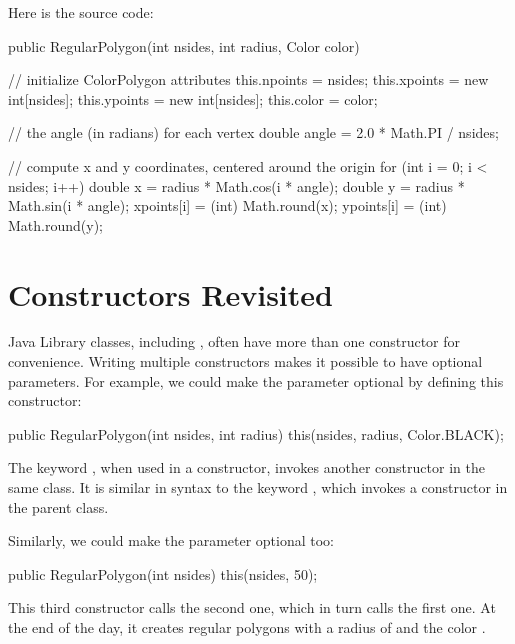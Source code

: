 Here is the source code:

\begin{code}
public RegularPolygon(int nsides, int radius, Color color) {

    // initialize ColorPolygon attributes
    this.npoints = nsides;
    this.xpoints = new int[nsides];
    this.ypoints = new int[nsides];
    this.color = color;

    // the angle (in radians) for each vertex
    double angle = 2.0 * Math.PI / nsides;

    // compute x and y coordinates, centered around the origin
    for (int i = 0; i < nsides; i++) {
        double x = radius * Math.cos(i * angle);
        double y = radius * Math.sin(i * angle);
        xpoints[i] = (int) Math.round(x);
        ypoints[i] = (int) Math.round(y);
    }
}
\end{code}



\section{Constructors Revisited}

Java Library classes, including , often have more than one constructor for convenience.
Writing multiple constructors makes it possible to have optional parameters.
For example, we could make the  parameter optional by defining this constructor:

\begin{code}
public RegularPolygon(int nsides, int radius) {
    this(nsides, radius, Color.BLACK);
}
\end{code}

The keyword , when used in a constructor, invokes another constructor in the same class.
It is similar in syntax to the keyword , which invokes a constructor in the parent class.

Similarly, we could make the  parameter optional too:

\begin{code}
public RegularPolygon(int nsides) {
    this(nsides, 50);
}
\end{code}

This third constructor calls the second one, which in turn calls the first one.
At the end of the day, it creates regular polygons with a radius of  and the color .

